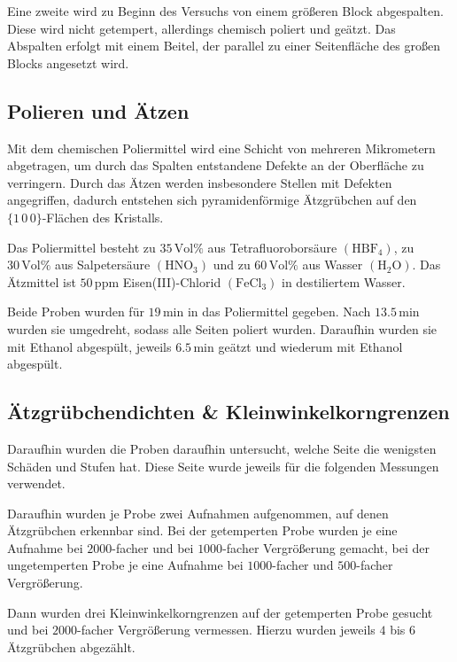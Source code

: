 \documentclass[12pt,a4paper]{scrartcl}
\numberwithin{equation}{section} %
\renewcommand{\[}{} %
\renewcommand{\]}{\noindent} %
\begin{document}
Eine zweite wird zu Beginn des Versuchs von einem größeren Block
abgespalten. Diese wird nicht getempert, allerdings chemisch poliert und
geätzt. Das Abspalten erfolgt mit einem Beitel, der parallel zu einer
Seitenfläche des großen Blocks angesetzt wird.

\hypertarget{polieren-und-uxe4tzen}{%
\subsection{Polieren und Ätzen}\label{polieren-und-uxe4tzen}}

Mit dem chemischen Poliermittel wird eine Schicht von mehreren
Mikrometern abgetragen, um durch das Spalten entstandene Defekte an der
Oberfläche zu verringern. Durch das Ätzen werden insbesondere Stellen
mit Defekten angegriffen, dadurch entstehen sich pyramidenförmige
Ätzgrübchen auf den \(\{1\,0\,0\}\)-Flächen des Kristalls.

Das Poliermittel besteht zu \(35\,\mathrm{Vol\%}\) aus
Tetrafluoroborsäure \((\mathrm{HBF_4})\), zu \(30\,\mathrm{Vol\%}\) aus
Salpetersäure \((\mathrm{HNO_3})\) und zu \(60\,\mathrm{Vol\%}\) aus
Wasser \((\mathrm{H_2O})\). Das Ätzmittel ist \(50\,\mathrm{ppm}\)
Eisen(III)-Chlorid \((\mathrm{FeCl_3})\) in destiliertem Wasser.

Beide Proben wurden für \(19\mathrm{\,min}\) in das Poliermittel
gegeben. Nach \(13.5\mathrm{\,min}\) wurden sie umgedreht, sodass alle
Seiten poliert wurden. Daraufhin wurden sie mit Ethanol abgespült,
jeweils \(6.5\mathrm{\,min}\) geätzt und wiederum mit Ethanol abgespült.

\hypertarget{uxe4tzgruxfcbchendichten-kleinwinkelkorngrenzen}{%
\subsection{Ätzgrübchendichten \&
Kleinwinkelkorngrenzen}\label{uxe4tzgruxfcbchendichten-kleinwinkelkorngrenzen}}

Daraufhin wurden die Proben daraufhin untersucht, welche Seite die
wenigsten Schäden und Stufen hat. Diese Seite wurde jeweils für die
folgenden Messungen verwendet.

Daraufhin wurden je Probe zwei Aufnahmen aufgenommen, auf denen
Ätzgrübchen erkennbar sind. Bei der getemperten Probe wurden je eine
Aufnahme bei \(2000\)-facher und bei \(1000\)-facher Vergrößerung
gemacht, bei der ungetemperten Probe je eine Aufnahme bei
\(1000\)-facher und \(500\)-facher Vergrößerung.

Dann wurden drei Kleinwinkelkorngrenzen auf der getemperten Probe
gesucht und bei \(2000\)-facher Vergrößerung vermessen. Hierzu wurden
jeweils \(4\) bis \(6\) Ätzgrübchen abgezählt.
\end{document}
